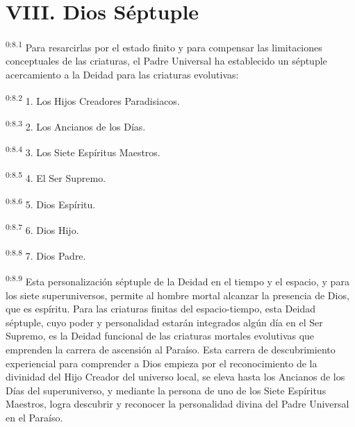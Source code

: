 \section*{VIII. Dios Séptuple}
\par
\textsuperscript{0:8.1} Para resarcirlas por el estado finito y para compensar las limitaciones conceptuales de las criaturas, el Padre Universal ha establecido un séptuple acercamiento a la Deidad para las criaturas evolutivas:

\par
\textsuperscript{0:8.2} 1. Los Hijos Creadores Paradisiacos.

\par
\textsuperscript{0:8.3} 2. Los Ancianos de los Días.

\par
\textsuperscript{0:8.4} 3. Los Siete Espíritus Maestros.

\par
\textsuperscript{0:8.5} 4. El Ser Supremo.

\par
\textsuperscript{0:8.6} 5. Dios Espíritu.

\par
\textsuperscript{0:8.7} 6. Dios Hijo.

\par
\textsuperscript{0:8.8} 7. Dios Padre.

\par
\textsuperscript{0:8.9} Esta personalización séptuple de la Deidad en el tiempo y el espacio, y para los siete superuniversos, permite al hombre mortal alcanzar la presencia de Dios, que es espíritu. Para las criaturas finitas del espacio-tiempo, esta Deidad séptuple, cuyo poder y personalidad estarán integrados algún día en el Ser Supremo, es la Deidad funcional de las criaturas mortales evolutivas que emprenden la carrera de ascensión al Paraíso. Esta carrera de descubrimiento experiencial para comprender a Dios empieza por el reconocimiento de la divinidad del Hijo Creador del universo local, se eleva hasta los Ancianos de los Días del superuniverso, y mediante la persona de uno de los Siete Espíritus Maestros, logra descubrir y reconocer la personalidad divina del Padre Universal en el Paraíso.


